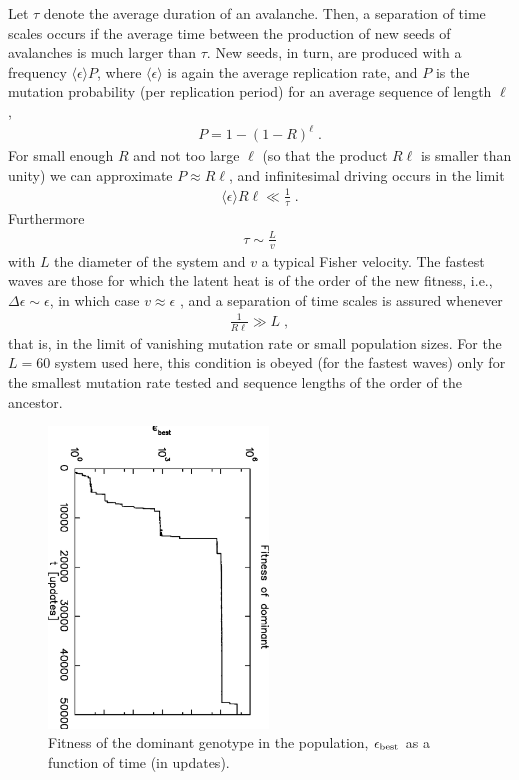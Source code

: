 \documentclass[letterpaper]{article}
\begin{document}
Let $\tau$ denote the average duration of an avalanche. Then, a
separation of time scales occurs if the average time between the
production of new seeds of avalanches is much larger than $\tau$. New
seeds, in turn, are produced with a frequency $\langle\epsilon\rangle
P$, where $\langle\epsilon\rangle$ is again the average replication
rate, and $P$ is the mutation probability (per replication period) for
an average sequence of length $\ell$,
\begin{eqnarray}
P=1-(1-R)^\ell\;.
\end{eqnarray}
For small enough $R$ and not too large $\ell$ (so that the product
$R\ell$ is smaller than unity) we can approximate
$P\approx R\ell$, and infinitesimal driving occurs in the limit
\begin{eqnarray}
\langle \epsilon\rangle R\ell \ll\frac1\tau\;.\label{cond}
\end{eqnarray}
Furthermore
\begin{eqnarray}
\tau\sim\frac{L}v
\end{eqnarray}
with $L$ the diameter of the system and $v$ a typical Fisher velocity.
The fastest waves are those for which the latent heat is of the order
of the new fitness, i.e., $\Delta\epsilon\sim\epsilon$, in which case
$v\approx \epsilon$ \citep[because $D\sim\epsilon$ in
Eq.~(\ref{eq4}),][]{CHU}, and a separation of time scales is assured
whenever
\begin{eqnarray}
\frac1{R\ell}\gg {L}\;,
\end{eqnarray}
that is, in the limit of vanishing mutation rate or small population
sizes. For the $L=60$ system used here, this condition is obeyed (for
the fastest waves) only for the smallest mutation rate tested and
sequence lengths of the order of the ancestor.


\begin{figure}[t]
\includegraphics[width=2.3in, angle=90]{fig2.eps}
\caption{Fitness of the dominant genotype in the population, $\epsilon_{\rm best}$ as a function of time (in updates).}
\label{fig2}
\end{figure}
\end{document}
